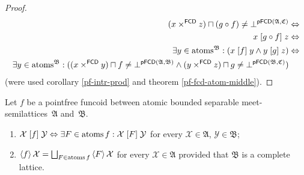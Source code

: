 \begin{proof}
~
\begin{align*}
(x\times^{\mathsf{FCD}}z)\sqcap(g\circ f)\ne\bot^{\mathsf{pFCD}(\mathfrak{A},\mathfrak{C})} & \Leftrightarrow\\
x\mathrel{\left[g\circ f\right]}z & \Leftrightarrow\\
\exists y\in\operatorname{atoms}^{\mathfrak{B}}:(x\mathrel{\left[f\right]}y\land y\mathrel{\left[g\right]}z) & \Leftrightarrow\\
\exists y\in\operatorname{atoms}^{\mathfrak{B}}:((x\times^{\mathsf{FCD}}y)\sqcap f\ne\bot^{\mathsf{pFCD}(\mathfrak{A},\mathfrak{B})}\land(y\times^{\mathsf{FCD}}z)\sqcap g\ne\bot^{\mathsf{pFCD}(\mathfrak{B},\mathfrak{C})})
\end{align*}
(were used corollary \ref{pf-intr-prod} and theorem \ref{pf-fcd-atom-middle}).\end{proof}
\begin{thm}
Let $f$ be a pointfree funcoid between atomic bounded separable meet-semilattices~$\mathfrak{A}$ and~$\mathfrak{B}$.
\begin{enumerate}
\item \label{pf-r-at}$\mathcal{X}\mathrel{\left[f\right]}\mathcal{Y}\Leftrightarrow\exists F\in\operatorname{atoms} f:\mathcal{X}\mathrel{\left[F\right]}\mathcal{Y}$
for every $\mathcal{X}\in\mathfrak{A}$, $\mathcal{Y}\in\mathfrak{B}$;
\item \label{pf-f-at}$\supfun f\mathcal{X}=\bigsqcup_{F\in\atoms f}\supfun F\mathcal{X}$
for every $\mathcal{X}\in\mathfrak{A}$ provided that $\mathfrak{B}$ is a complete lattice.
\end{enumerate}
\end{thm}
